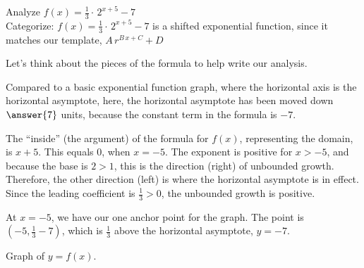 \documentclass{ximera}
\begin{document}
\begin{example}  



Analyze   $f(x) = \frac{1}{3} \cdot \, 2^{x+5} - 7$ \\



Categorize:   $f(x) = \frac{1}{3} \cdot \, 2^{x+5} - 7$ is a shifted exponential function, since it matches our template, $A \, r^{B \, x + C} + D$



Let's think about the pieces of the formula to help write our analysis. \\

\begin{idea}




Compared to a basic exponential function graph, where the horizontal axis is the horizontal asymptote, here, the horizontal asymptote has been moved down $\answer{7}$ units, because the constant term in the formula is $-7$.



The ``inside'' (the argument) of the formula for $f(x)$, representing the domain, is $x+5$.  This equals $0$, when $x=-5$.  The exponent is positive for $x>-5$, and because the base is $2 > 1$, this is the direction (right) of unbounded growth.  Therefore, the other direction (left) is where the horizontal asymptote is in effect.  Since the leading coefficient is $\frac{1}{3} > 0$, the unbounded growth is positive.

At $x=-5$, we have our one anchor point for the graph.  The point is $\left(-5, \frac{1}{3} - 7 \right)$, which is $\frac{1}{3}$ above the horizontal asymptote, $y = -7$.


Graph of $y = f(x)$.

\begin{image}
\end{image}
\end{idea}
\end{example}
\end{document}
